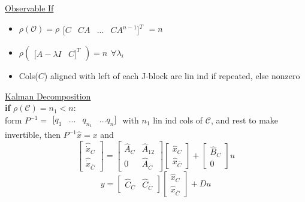 \documentclass[twocolumn]{article}    %
\begin{document}
\noindent
\underline{Observable If}
\begin{itemize}
    \item \(\rho(\mathcal{O}) = \rho\begin{matrix}
        [C & CA & ... & CA^{n-1}]^T 
    \end{matrix}=n\)
    \item \(\rho(\begin{matrix}
        [A-\lambda I & C]^T
    \end{matrix}) = n \hspace{5pt} \forall \lambda_i\) 
    \item Cols(\(C\)) aligned with left of each J-block are lin ind if repeated, else nonzero
\end{itemize}

\noindent
\underline{Kalman Decomposition}\\
\textbf{if} \(\rho(\mathcal{C}) = n_1<n\):\\
form \(P^{-1} = \begin{matrix}
        [q_1 & ... & q_{n_1} & ... q_n]
        \end{matrix}\) with  \(n_1\) lin ind cols of \(\mathcal{C}\), and rest to make invertible, then \(P^{-1} \hat{x} = x\) and 
        \begin{equation*}
            \begin{bmatrix}
                \hat{\Dot{x}}_C \\ \hat{\Dot{x}}_{\overline{C} }
            \end{bmatrix} = \begin{bmatrix}
                \hat{A}_C & \hat{A}_{12} \\ 
                0 & \hat{A}_{\overline{C}}
            \end{bmatrix} \begin{bmatrix}
                \hat{x}_C \\ \hat{x}_{\overline{C}}
            \end{bmatrix} + \begin{bmatrix}
                \hat{B}_C \\ 0
            \end{bmatrix} u
        \end{equation*}
        \begin{equation*}
            y = \begin{bmatrix}
                \hat{C}_C & \hat{C}_{\overline{C}}
            \end{bmatrix} \begin{bmatrix}
                \hat{x}_C \\ \hat{x}_{\overline{C}}
            \end{bmatrix} + Du
        \end{equation*}
        
\end{document}
